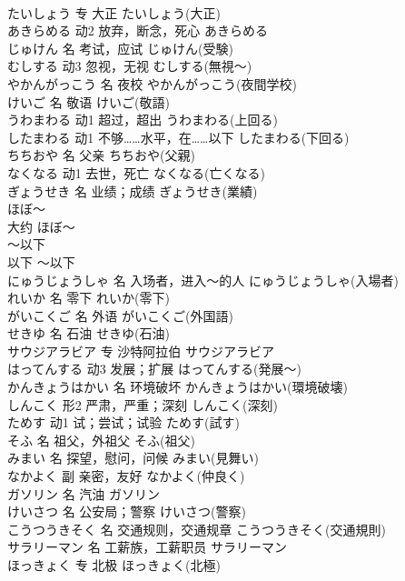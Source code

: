 \documentclass[8pt]{extreport}
\begin{document}
\begin{CJK}{UTF8}{min}
\\	たいしょう	专	大正	たいしょう(大正)	
\\	あきらめる	动2	放弃，断念，死心	あきらめる	
\\	じゅけん	名	考试，应试	じゅけん(受験)	
\\	むしする	动3	忽视，无视	むしする(無視～)	
\\	やかんがっこう	名	夜校	やかんがっこう(夜間学校)	
\\	けいご	名	敬语	けいご(敬語)	
\\	うわまわる	动1	超过，超出	うわまわる(上回る)	
\\	したまわる	动1	不够……水平，在……以下	したまわる(下回る)	
\\	ちちおや	名	父亲	ちちおや(父親)	
\\	なくなる	动1	去世，死亡	なくなる(亡くなる)	
\\	ぎょうせき	名	业绩；成绩	ぎょうせき(業績)	
\\	ほぼ～	
\\	大约	ほぼ～	
\\	～以下	
\\	以下	～以下	
\\	にゅうじょうしゃ	名	入场者，进入～的人	にゅうじょうしゃ(入場者)	
\\	れいか	名	零下	れいか(零下)	
\\	がいこくご	名	外语	がいこくご(外国語)	
\\	せきゆ	名	石油	せきゆ(石油)	
\\	サウジアラビア	专	沙特阿拉伯	サウジアラビア	
\\	はってんする	动3	发展；扩展	はってんする(発展～)	
\\	かんきょうはかい	名	环境破坏	かんきょうはかい(環境破壊)	
\\	しんこく	形2	严肃，严重；深刻	しんこく(深刻)	
\\	ためす	动1	试；尝试；试验	ためす(試す)	
\\	そふ	名	祖父，外祖父	そふ(祖父)	
\\	みまい	名	探望，慰问，问候	みまい(見舞い)	
\\	なかよく	副	亲密，友好	なかよく(仲良く)	
\\	ガソリン	名	汽油	ガソリン	
\\	けいさつ	名	公安局；警察	けいさつ(警察)	
\\	こうつうきそく	名	交通规则，交通规章	こうつうきそく(交通規則)	
\\	サラリーマン	名	工薪族，工薪职员	サラリーマン	
\\	ほっきょく	专	北极	ほっきょく(北極)	

\end{CJK}
\end{document}
